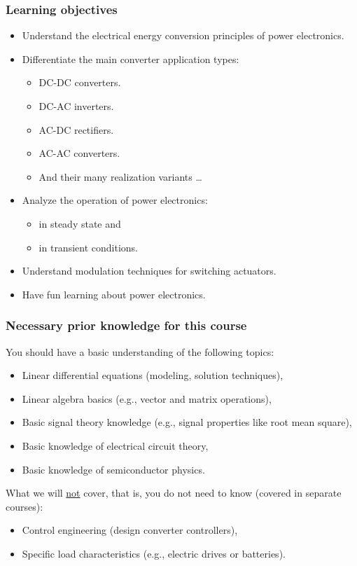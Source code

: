 \begin{frame}
	\frametitle{Learning objectives}
	\begin{itemize}
		\item Understand the electrical energy conversion principles of power electronics.
		\item<2-> Differentiate the main converter application types:
		      \begin{itemize}
			      \item DC-DC converters.
			      \item DC-AC inverters.
			      \item AC-DC rectifiers.
			      \item AC-AC converters.
			      \item And their many realization variants \ldots
		      \end{itemize}
		\item<3-> Analyze the operation of power electronics:
		      \begin{itemize}
			      \item in steady state and
			      \item in transient conditions.
		      \end{itemize}
		\item<4-> Understand modulation techniques for switching actuators.
		\item<5-> Have fun learning about power electronics.
	\end{itemize}
\end{frame}

\begin{frame}
	\frametitle{Necessary prior knowledge for this course}
	You should have a basic understanding of the following topics:
	\begin{itemize}
		\item Linear differential equations (modeling, solution techniques),
		\item Linear algebra basics (e.g., vector and matrix operations),
		\item Basic signal theory knowledge (e.g., signal properties like root mean square),
		\item Basic knowledge of electrical circuit theory,
		\item Basic knowledge of semiconductor physics.
	\end{itemize}
	\vspace{0.5cm}
	What we will \underline{not} cover, that is, you do not need to know (covered in separate courses):
	\begin{itemize}
		\item Control engineering (design converter controllers),
		\item Specific load characteristics (e.g., electric drives or batteries).
	\end{itemize}
\end{frame}

